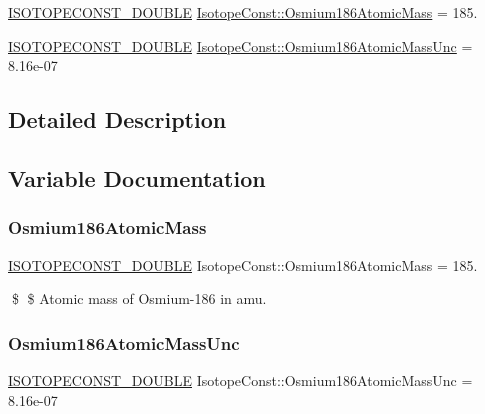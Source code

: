 \begin{DoxyCompactItemize}
\item 
\mbox{\hyperlink{group___isotope_const-_macros_ga8f45a7272ce02c0b4c65c44636ed719a}{I\+S\+O\+T\+O\+P\+E\+C\+O\+N\+S\+T\+\_\+\+D\+O\+U\+B\+LE}} \mbox{\hyperlink{group___isotope_const-_osmium-_os186_ga2fad30669d1f581b377395ed1b3b8587}{Isotope\+Const\+::\+Osmium186\+Atomic\+Mass}} = 185.
\item 
\mbox{\hyperlink{group___isotope_const-_macros_ga8f45a7272ce02c0b4c65c44636ed719a}{I\+S\+O\+T\+O\+P\+E\+C\+O\+N\+S\+T\+\_\+\+D\+O\+U\+B\+LE}} \mbox{\hyperlink{group___isotope_const-_osmium-_os186_ga2aab884a216c1296b6733233e1096377}{Isotope\+Const\+::\+Osmium186\+Atomic\+Mass\+Unc}} = 8.\+16e-\/07
\end{DoxyCompactItemize}


\subsection{Detailed Description}


\subsection{Variable Documentation}
\mbox{\label{group___isotope_const-_osmium-_os186_ga2fad30669d1f581b377395ed1b3b8587}} 
\subsubsection{\texorpdfstring{Osmium186\+Atomic\+Mass}{Osmium186AtomicMass}}
{\footnotesize\ttfamily \mbox{\hyperlink{group___isotope_const-_macros_ga8f45a7272ce02c0b4c65c44636ed719a}{I\+S\+O\+T\+O\+P\+E\+C\+O\+N\+S\+T\+\_\+\+D\+O\+U\+B\+LE}} Isotope\+Const\+::\+Osmium186\+Atomic\+Mass = 185.}

\$ \$ Atomic mass of Osmium-\/186 in amu. \mbox{\label{group___isotope_const-_osmium-_os186_ga2aab884a216c1296b6733233e1096377}} 
\subsubsection{\texorpdfstring{Osmium186\+Atomic\+Mass\+Unc}{Osmium186AtomicMassUnc}}
{\footnotesize\ttfamily \mbox{\hyperlink{group___isotope_const-_macros_ga8f45a7272ce02c0b4c65c44636ed719a}{I\+S\+O\+T\+O\+P\+E\+C\+O\+N\+S\+T\+\_\+\+D\+O\+U\+B\+LE}} Isotope\+Const\+::\+Osmium186\+Atomic\+Mass\+Unc = 8.\+16e-\/07}

